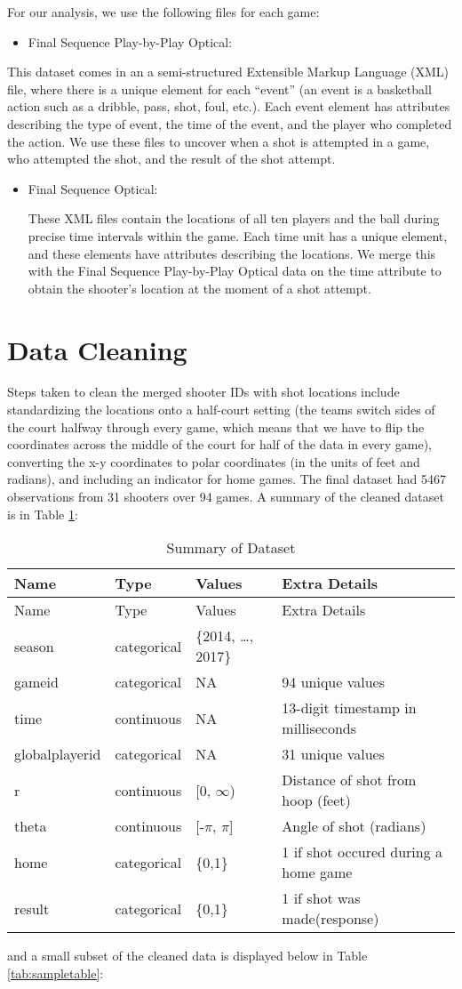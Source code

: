 \documentclass[12pt,twoside]{dukestatscithesis}
\providecommand{\tightlist}{%
  \setlength{\itemsep}{0pt}\setlength{\parskip}{0pt}}
\theoremstyle{definition}
\theoremstyle{definition}
\theoremstyle{definition}
\theoremstyle{remark}
\begin{document}
For our analysis, we use the following files for each game:
\begin{itemize}
\tightlist
\item
  Final Sequence Play-by-Play Optical:
\end{itemize}
This dataset comes in an a semi-structured Extensible Markup Language
(XML) file, where there is a unique element for each ``event'' (an event
is a basketball action such as a dribble, pass, shot, foul, etc.). Each
event element has attributes describing the type of event, the time of
the event, and the player who completed the action. We use these files
to uncover when a shot is attempted in a game, who attempted the shot,
and the result of the shot attempt.
\begin{itemize}
\item
  Final Sequence Optical:

  These XML files contain the locations of all ten players and the ball
  during precise time intervals within the game. Each time unit has a
  unique element, and these elements have attributes describing the
  locations. We merge this with the Final Sequence Play-by-Play Optical
  data on the time attribute to obtain the shooter's location at the
  moment of a shot attempt.
\end{itemize}
\section{Data Cleaning}\label{data-cleaning}

Steps taken to clean the merged shooter IDs with shot locations include
standardizing the locations onto a half-court setting (the teams switch
sides of the court halfway through every game, which means that we have
to flip the coordinates across the middle of the court for half of the
data in every game), converting the x-y coordinates to polar coordinates
(in the units of feet and radians), and including an indicator for home
games. The final dataset had 5467 observations from 31 shooters over 94
games. A summary of the cleaned dataset is in Table
\ref{tab:summarytable}:
\begin{longtable}[]{@{}llll@{}}
\caption{\label{tab:summarytable}Summary of Dataset}\tabularnewline
\toprule
Name & Type & Values & Extra Details\tabularnewline
\midrule
\endfirsthead
\toprule
Name & Type & Values & Extra Details\tabularnewline
\midrule
\endhead
season & categorical & \{2014, \ldots{}, 2017\} &\tabularnewline
gameid & categorical & NA & 94 unique values\tabularnewline
time & continuous & NA & 13-digit timestamp in
milliseconds\tabularnewline
globalplayerid & categorical & NA & 31 unique values\tabularnewline
r & continuous & {[}0, \(\infty\)) & Distance of shot from hoop
(feet)\tabularnewline
theta & continuous & {[}-\(\pi\), \(\pi\){]} & Angle of shot
(radians)\tabularnewline
home & categorical & \{0,1\} & 1 if shot occured during a home
game\tabularnewline
result & categorical & \{0,1\} & 1 if shot was
made(response)\tabularnewline
\bottomrule
\end{longtable}
and a small subset of the cleaned data is displayed below in Table
\ref{tab:sampletable}:
\end{document}
